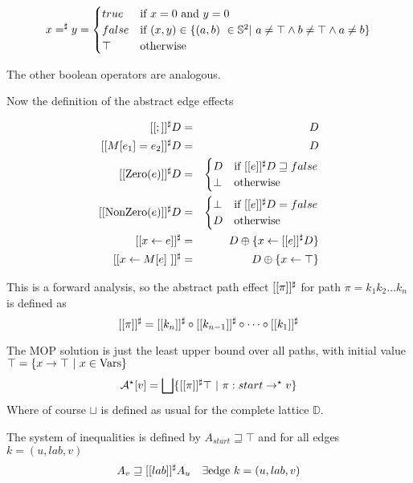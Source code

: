 \documentclass[a4paper]{article}
\begin{document}
$$
  x =^\sharp y = \begin{cases}
    true    & \text{if $ x = 0 $ and $ y = 0 $} \\
    false   & \text{if $ (x, y) \in \{ (a, b)\ \in \mathbb{S}^2 |\ a \ne \top \land b \ne \top \land a \ne b \} $} \\
    \top    & \text{otherwise} \\
  \end{cases}
$$

The other boolean operators are analogous.

Now the definition of the abstract edge effects

\begin{eqnarray*}
  \aee{;} D &=& D \\
  \aee{M[e_1] = e_2} D &=& D \\
  \aee{\Zero(e)} D &=& \begin{cases}
    D     & \text{if $ \aee{e} D \sqsupseteq false $} \\
    \bot  & \text{otherwise} \\
  \end{cases} \\
  \aee{\NonZero(e)} D &=& \begin{cases}
    \bot  & \text{if $ \aee{e} D = false $} \\
    D     & \text{otherwise} \\
  \end{cases} \\
  \aee{x \leftarrow e} &=& D \oplus \{ x \leftarrow \aee{e} D \} \\
  \aee{x \leftarrow M[e]\ } &=& D \oplus \{ x \leftarrow \top \} \\
\end{eqnarray*}

This is a forward analysis, so the abstract path effect $ [[\pi]]^\sharp $ for path $ \pi = k_1 k_2 \dots k_n $ is defined as $$ [[\pi]]^\sharp = [[k_n]]^\sharp \circ [[k_{n-1}]]^\sharp \circ \dots \circ [[k_1]]^\sharp $$

The MOP solution is just the least upper bound over all paths, with initial value $ \top = \{ x \to \top\ |\ x \in \mathrm{Vars} \} $
$$
  \mathcal{A}^\star[v] = \bigsqcup \{ [[\pi]]^\sharp \top\ |\ \pi : start \to^\star v \}
$$
Where of course $ \sqcup $ is defined as usual for the complete lattice $ \mathbb{D} $.

The system of inequalities is defined by $ A_{start} \sqsupseteq \top $ and for all edges $ k = (u, lab, v) $
$$
  A_v \sqsupseteq [[lab]]^\sharp A_u \quad \exists \text{edge } k = (u, lab, v)
$$
\end{document}
